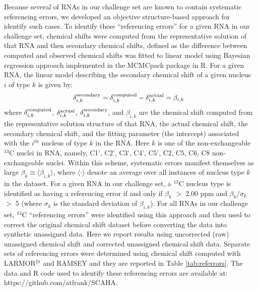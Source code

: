\documentclass[journal=jcisd8,manuscript=article,layout=onecolumn]{achemso}
\begin{document}
Because several of RNAs in our challenge set are known to contain systematic referencing errors\cite{aeschbacher2012procedure}, we developed an objective structure-based approach for identify such cases. To identify these ``referencing errors'' for a given RNA in our challenge set, chemical shifts were computed from the representative solution of that  RNA and then secondary chemical shifts, defined as the difference between computed and  observed chemical shifts was fitted to linear model using Bayesian regression approach implemented in the MCMCpack package in R\cite{martin2011mcmcpack}. For a given RNA, the linear model describing the secondary chemical shift of a given nucleus $i$ of type $k$ is given by:
\begin{equation}\label{eq:wmae} 
\delta^{\rm secondary}_{i, k} =  \delta^{\rm computed}_{i, k} - \delta^{\rm actual}_{i, k} = \beta_{i, k}
\end{equation}
where $\delta^{\rm computed}_{i, k}$, $\delta^{\rm actual}_{i, k}$, $\delta^{\rm secondary}_{i, k}$, and $\beta_{i, k}$ are the chemical shift computed from the representative solution structure of that RNA, the actual chemical shift,  the secondary chemical shift, and  the fitting parameter (the intercept) associated with the $i^{th}$ nucleus of type $k$ in the RNA. Here $k$ is one of the non-exchangeable $^{13}$C nuclei in RNA, namely, C1', C2', C3', C4', C5', C2, C5, C6, C8 non-exchangeable nuclei. Within this scheme, systematic errors manifest themselves as large $\beta_{k} \equiv \langle\beta_{i, k} \rangle$, where $\langle\cdot \rangle$ denote an average over all instances of nucleus type $k$ in the dataset. For a given RNA in our challenge set, a $^{13}$C nucleus type is identified as having a referencing error if and only if $\beta_{k}$  $>$ 2.00 ppm  and $\beta_{k}$/$\sigma_{k}$ $>$ 5 (where $\sigma_{k}$ is the standard deviation of  $\beta_{i, k}$). For all RNAs in our challenge set, $^{13}$C ``referencing errors'' were identified using this approach and then used to correct the original chemical shift dataset before converting the data into synthetic unassigned data. Here we report results using uncorrected (raw) unassigned chemical shift and corrected unassigned chemical shift data. Separate sets of referencing errors were determined using chemical shift computed with LARMOR$^{\rm D}$ and RAMSEY and they are reported in Table \ref{tab:referrors}. The data and R code  used to identify these referencing errors are available at: https://github.com/atfrank/SCAHA.
\end{document}

